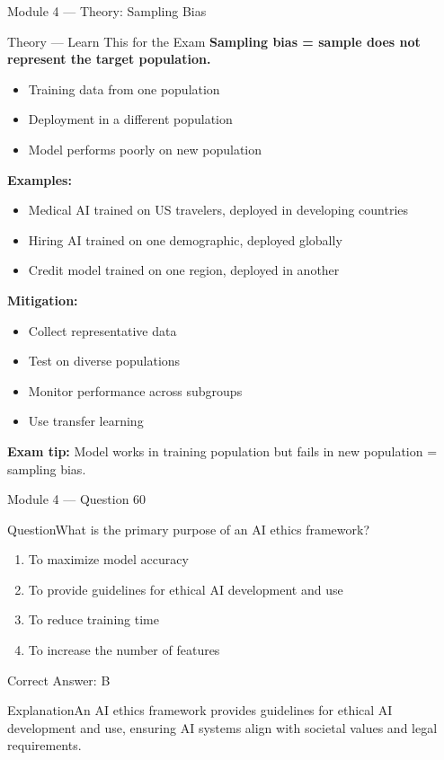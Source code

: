 \documentclass[aspectratio=169,10pt]{beamer}
\newcommand{\question}[1]{\begin{block}{Question}#1\end{block}}
\newcommand{\options}[4]{%
	\begin{enumerate}[label=\Alph*.,leftmargin=*]
		\item #1
		\item #2
		\item #3
		\item #4
	\end{enumerate}
}
\newcommand{\answerbox}[1]{\begin{exampleblock}{Correct Answer: #1}\end{exampleblock}}
\newcommand{\explain}[1]{\begin{block}{Explanation}#1\end{block}}
\newcommand{\theory}[1]{%
	\begin{block}{Theory --- Learn This for the Exam}
		\small #1
	\end{block}
}
\begin{document}
	\begin{frame}{Module 4 --- Theory: Sampling Bias}
		\theory{
			\textbf{Sampling bias = sample does not represent the target population.}
			\begin{itemize}
				\item Training data from one population
				\item Deployment in a different population
				\item Model performs poorly on new population
			\end{itemize}
			\textbf{Examples:}
			\begin{itemize}
				\item Medical AI trained on US travelers, deployed in developing countries
				\item Hiring AI trained on one demographic, deployed globally
				\item Credit model trained on one region, deployed in another
			\end{itemize}
			\textbf{Mitigation:}
			\begin{itemize}
				\item Collect representative data
				\item Test on diverse populations
				\item Monitor performance across subgroups
				\item Use transfer learning
			\end{itemize}
			\textbf{Exam tip:} Model works in training population but fails in new population = sampling bias.
		}
	\end{frame}
	
	\begin{frame}{Module 4 --- Question 60}
		\question{What is the primary purpose of an AI ethics framework?}
		\options{To maximize model accuracy}{To provide guidelines for ethical AI development and use}{To reduce training time}{To increase the number of features}
		\answerbox{B}
		\explain{An AI ethics framework provides guidelines for ethical AI development and use, ensuring AI systems align with societal values and legal requirements.}
	\end{frame}
	
\end{document}
